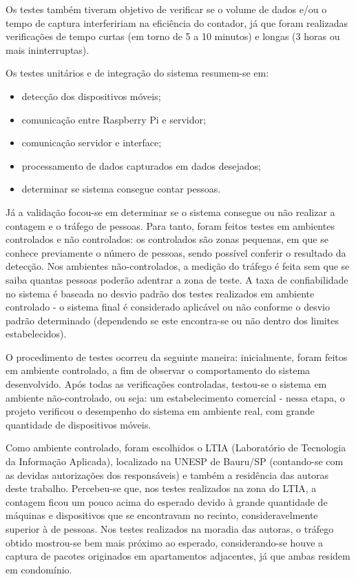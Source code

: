 Os testes também tiveram objetivo de verificar se o volume de dados e/ou o tempo de captura interfeririam na eficiência do contador, já que foram realizadas verificações de tempo curtas (em torno de 5 a 10 minutos) e longas (3 horas ou mais ininterruptas). 

Os testes unitários e de integração do sistema resumem-se em:

\begin{itemize}
  \item detecção dos dispositivos móveis;
  \item comunicação entre Raspberry Pi e servidor;
  \item comunicação servidor e interface;
  \item processamento de dados capturados em dados desejados;
  \item determinar se sistema consegue contar pessoas.
\end{itemize}

Já a validação focou-se em determinar se o sistema consegue ou
não realizar a contagem e o tráfego de pessoas. Para tanto, foram feitos testes em
ambientes controlados e não controlados: os controlados são zonas pequenas, em que se conhece previamente o número de pessoas, sendo possível conferir o resultado da detecção. Nos ambientes não-controlados, a medição do tráfego é feita sem que se saiba quantas pessoas poderão adentrar a zona de teste. A taxa de confiabilidade no sistema é baseada no desvio padrão dos testes realizados em ambiente controlado - o sistema final é considerado aplicável ou não conforme o desvio padrão determinado (dependendo se este encontra-se ou não dentro dos limites estabelecidos).

O procedimento de testes ocorreu da seguinte maneira: inicialmente, foram feitos em ambiente controlado, a fim de observar o comportamento do sistema desenvolvido. Após todas as verificações controladas, testou-se o sistema em ambiente não-controlado, ou seja: um estabelecimento comercial - nessa etapa, o projeto verificou o desempenho do sistema em ambiente real, com grande quantidade de dispositivos móveis. 

Como ambiente controlado, foram escolhidos o LTIA (Laboratório de Tecnologia da Informação Aplicada), localizado na UNESP de Bauru/SP (contando-se com as devidas autorizações dos responsáveis) e também a residência das autoras deste trabalho. Percebeu-se que, nos testes realizados na zona do LTIA, a contagem ficou um pouco acima do esperado devido à grande quantidade de máquinas e dispositivos que se encontravam no recinto, consideravelmente superior à de pessoas. Nos testes realizados na moradia das autoras, o tráfego obtido mostrou-se bem mais próximo ao esperado, considerando-se houve a captura de pacotes originados em  apartamentos adjacentes, já que ambas residem em condomínio.

